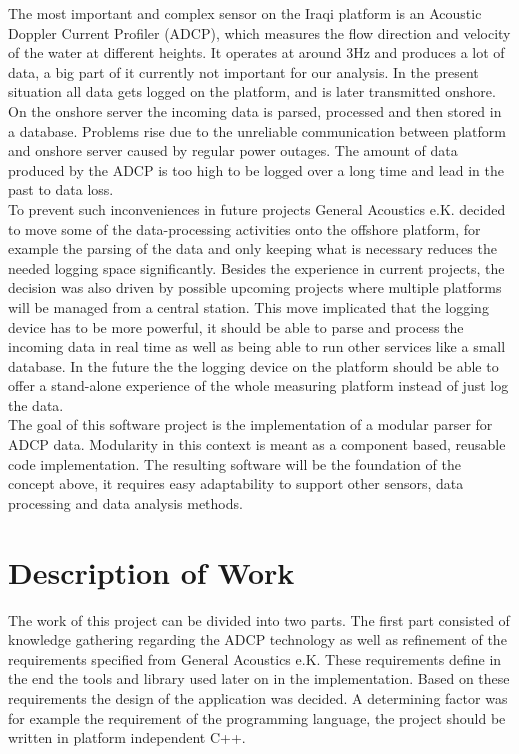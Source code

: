 The most important and complex sensor on the Iraqi platform is an Acoustic Doppler Current Profiler (ADCP), which measures the flow direction and velocity of the water at different heights. It operates at around 3Hz and produces a lot of data, a big part of it currently not important for our analysis. In the present situation all data gets logged on the platform, and is later transmitted onshore. On the onshore server the incoming data is parsed, processed and then stored in a database. Problems rise due to the unreliable communication between platform and onshore server caused by regular power outages. The amount of data produced by the ADCP is too high to be logged over a long time and lead in the past to data loss.\\\newline
To prevent such inconveniences in future projects General Acoustics e.K. decided to move some of the data-processing activities onto the offshore platform, for example the parsing of the data and only keeping what is necessary reduces the needed logging space significantly. Besides the experience in current projects, the decision was also driven by possible upcoming projects where multiple platforms will be managed from a central station. This move implicated that the logging device has to be more powerful, it should be able to parse and process the incoming data in real time as well as being able to run other services like a small database. In the future the the logging device on the platform should be able to offer a stand-alone experience of the whole measuring platform instead of just log the data.\\\newline
The goal of this software project is the implementation of a modular parser for ADCP data. Modularity in this context is meant as a component based, reusable code implementation. The resulting software will be the foundation of the concept above, it requires easy adaptability to support other sensors, data processing and data analysis methods. 

\section{Description of Work}
The work of this project can be divided into two parts. The first part consisted of knowledge gathering regarding the ADCP technology as well as refinement of the requirements specified from General Acoustics e.K. These requirements define in the end the tools and library used later on in the implementation. Based on these requirements the design of the application was decided. A determining factor was for example the requirement of the programming language, the project should be written in platform independent C++.

